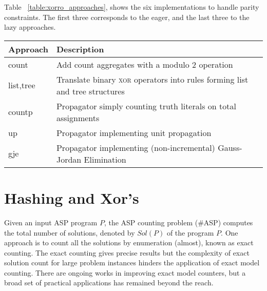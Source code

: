 \documentclass{article}
\def\asp{\textsf{\#ASP}\xspace}
\newcommand{\XOR}{\textsc{xor}} %
\newcommand{\fff}{$P$\xspace}
\newcommand{\sol}{$Sol(P)$\xspace}
\newcommand{\sysfont}{\textit}
\newcommand{\xorro}{\sysfont{xorro}}
\begin{document}
Table~ \ref{table:xorro_approaches}, shows the six implementations to handle parity constraints.
The first three corresponds to the eager, and the last three to the lazy approaches.



\begin{table*}[t]
	\caption{\xorro{} approaches to handle parity constraints}\label{table:xorro_approaches}
	\begin{tabular}{ l|l }
		Approach  & Description  \\
		\hline\hline
		count     & Add count aggregates with a modulo 2 operation  \\
		list,tree & Translate binary \XOR{} operators into rules forming list and tree structures \\
		countp    & Propagator simply counting truth literals on total assignments\\
		up        & Propagator implementing unit propagation\\
		gje       & Propagator implementing (non-incremental) Gauss-Jordan Elimination

	\end{tabular}
\end{table*}
%

\section{Hashing and Xor's} \label{sec:hashing}
Given an input ASP program \fff, the ASP counting problem (\asp) computes the total number of solutions, denoted by \sol of the program \fff.
%
One approach is to count all the solutions by enumeration (almost), known as exact counting.
% 
The exact counting gives precise results but the complexity of exact solution count for large problem instances hinders the application of exact model counting.
%
There are ongoing works \cite{bibid} in improving exact model counters, but a broad set of practical applications has remained beyond the reach. 
%
\end{document}
